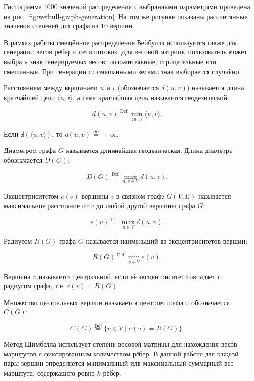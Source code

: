 Гистограмма 1000 значений распределения с выбранными параметрами приведена на рис. \ref{fig:weibull-graph-generation}. На том же рисунке показаны рассчитанные значения степеней для графа из 10 вершин.


В рамках работы смещённое распределение Вейбулла используется также для генерации весов рёбер и сети потоков. Для весовой матрицы пользователь может выбрать знак генерируемых весов: положительные, отрицательные или смешанные. При генерации со смешанными весами знак выбирается случайно.

Расстоянием между вершинами $u$ и $v$ (обозначается $d(u, v)$) называется длина кратчайшей цепи $\langle u, v\rangle$, а сама кратчайшая цепь называется геодезической.

\[
d(u, v) \stackrel{\text{Def}}{=} \min_{\langle u, v\rangle} \langle u, v\rangle.
\]

\begin{center}
Если $\nexists (\langle u, v\rangle)$, то $d(u, v) \stackrel{\text{Def}}{=} +\infty$.
\end{center}

Диаметром графа $G$ называется длиннейшая геодезическая. Длина диаметра обозначается $D(G)$:

\[
D(G) \stackrel{\text{Def}}{=} \max_{u, v \in V} d(u, v).
\]

Эксцентриситетом $e(v)$ вершины $v$ в связном графе $G(V, E)$ называется максимальное расстояние от $v$ до любой другой вершины графа $G$:

\[
e(v) \stackrel{\text{Def}}{=} \max_{u \in V} d(u, v).
\]

Радиусом $R(G)$ графа $G$ называется наименьший из эксцентриситетов вершин:

\[
R(G) \stackrel{\text{Def}}{=} \min_{v \in V} e(v).
\]

Вершина $v$ называется центральной, если её эксцентриситет совпадает с радиусом графа, т.е. $e(v) = R(G)$.

Множество центральных вершин называется центром графа и обозначается $C(G)$:

\[
C(G) \stackrel{\text{Def}}{=} \{v \in V \mid e(v) = R(G)\}.
\]

Метод Шимбелла использует степени весовой матрицы для нахождения весов маршрутов с фиксированным количеством рёбер. В данной работе для каждой пары вершин определяется минимальный или максимальный суммарный вес маршрута, содержащего ровно $k$ рёбер.


